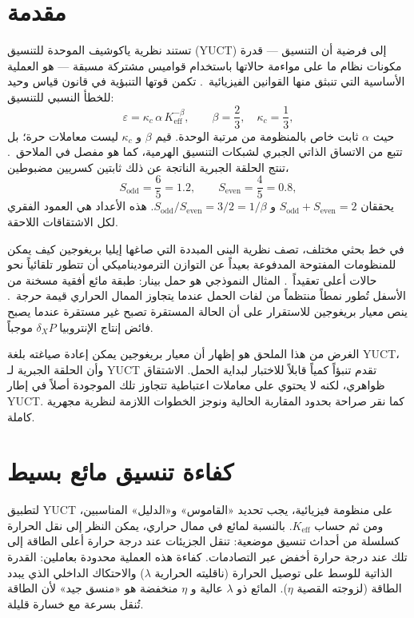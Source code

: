 \documentclass[12pt,a4paper]{article}
\begin{document}
	\section{مقدمة}
	تستند نظرية ياكوشيف الموحدة للتنسيق (YUCT) إلى فرضية أن التنسيق — قدرة مكونات نظام ما على مواءمة حالاتها باستخدام قواميس مشتركة مسبقة — هو العملية الأساسية التي تنبثق منها القوانين الفيزيائية~\cite{Yakushev2026}. تكمن قوتها التنبؤية في قانون قياس وحيد للخطأ النسبي للتنسيق:
	\begin{equation}\label{eq:universal}
		\varepsilon = \kappa_c\,\alpha\, K_{\mathrm{eff}}^{-\beta},\qquad 
		\beta = \frac{2}{3},\quad \kappa_c = \frac{1}{3},
	\end{equation}
	حيث \(\alpha\) ثابت خاص بالمنظومة من مرتبة الوحدة. قيم \(\beta\) و \(\kappa_c\) ليست معاملات حرة؛ بل تتبع من الاتساق الذاتي الجبري لشبكات التنسيق الهرمية، كما هو مفصل في الملاحق~\cite{AppendixY, AppendixL, AppendixFerra, AppendixAF}. تنتج الحلقة الجبرية الناتجة عن ذلك ثابتين كسريين مضبوطين،
	\begin{equation}\label{eq:S-constants}
		S_{\mathrm{odd}} = \frac{6}{5} = 1.2,\qquad
		S_{\mathrm{even}} = \frac{4}{5} = 0.8,
	\end{equation}
	يحققان \(S_{\mathrm{odd}} + S_{\mathrm{even}} = 2\) و \(S_{\mathrm{odd}}/S_{\mathrm{even}} = 3/2 = 1/\beta\). هذه الأعداد هي العمود الفقري لكل الاشتقاقات اللاحقة.
	
	في خط بحثي مختلف، تصف نظرية البنى المبددة التي صاغها إيليا بريغوجين كيف يمكن للمنظومات المفتوحة المدفوعة بعيداً عن التوازن الترموديناميكي أن تتطور تلقائياً نحو حالات أعلى تعقيداً~\cite{Prigogine1977, Glansdorff1971}. المثال النموذجي هو حمل بينار: طبقة مائع أفقية مسخنة من الأسفل تُطور نمطاً منتظماً من لفات الحمل عندما يتجاوز الممال الحراري قيمة حرجة~\cite{Chandrasekhar1961}. ينص معيار بريغوجين للاستقرار على أن الحالة المستقرة تصبح غير مستقرة عندما يصبح فائض إنتاج الإنتروبيا \(\delta_X P\) موجباً.
	
	الغرض من هذا الملحق هو إظهار أن معيار بريغوجين يمكن إعادة صياغته بلغة YUCT، وأن الحلقة الجبرية لـ YUCT تقدم تنبؤاً كمياً قابلاً للاختبار لبداية الحمل. الاشتقاق ظواهري، لكنه لا يحتوي على معاملات اعتباطية تتجاوز تلك الموجودة أصلاً في إطار YUCT. كما نقر صراحة بحدود المقاربة الحالية ونوجز الخطوات اللازمة لنظرية مجهرية كاملة.
	
	\section{كفاءة تنسيق مائع بسيط}
	لتطبيق YUCT على منظومة فيزيائية، يجب تحديد «القاموس» و«الدليل» المناسبين، ومن ثم حساب \(K_{\mathrm{eff}}\). بالنسبة لمائع في ممال حراري، يمكن النظر إلى نقل الحرارة كسلسلة من أحداث تنسيق موضعية: تنقل الجزيئات عند درجة حرارة أعلى الطاقة إلى تلك عند درجة حرارة أخفض عبر التصادمات. كفاءة هذه العملية محدودة بعاملين: القدرة الذاتية للوسط على توصيل الحرارة (ناقليته الحرارية \(\lambda\)) والاحتكاك الداخلي الذي يبدد الطاقة (لزوجته القصية \(\eta\)). المائع ذو \(\lambda\) عالية و \(\eta\) منخفضة هو «منسق جيد» لأن الطاقة تُنقل بسرعة مع خسارة قليلة.
	
\end{document}
